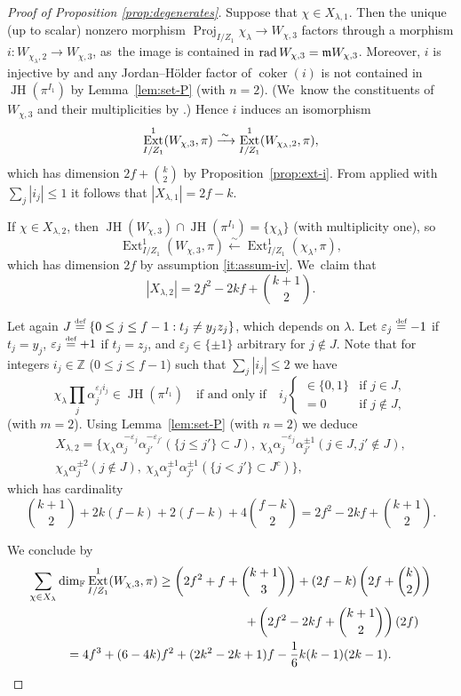 \documentclass[JEP,XML,SOM,Unicode,NoFloatCountersInSection, NoEqCountersInSection,published]{cedram}
\newcommand{\defeq}{\stackrel{\textrm{\tiny{\upshape{def}}}}{=}}
\newcommand{\F}{\mathbb{F}}
\newcommand{\Z}{{\mathbb Z}}
\DeclareMathOperator{\coker}{coker}
\DeclareMathOperator{\Ext}{Ext}
\DeclareMathOperator{\JH}{\mathrm{JH}}
\DeclareMathOperator{\Proj}{Proj}
\DeclareMathOperator{\rad}{rad}
\let\ve\varepsilon
\theoremstyle{plain}
\theoremstyle{definition}
\begin{document}
\begin{proof}[Proof of Proposition \ref{prop:degenerates}]
Suppose that $\chi \in X_{\lambda,1}$.
Then the unique (up to scalar) nonzero morphism $\Proj_{I/Z_1} \chi_\lambda \to W_{\chi,3}$ factors through a morphism $i: W_{\chi_\lambda,2} \to W_{\chi,3}$, as~the image is contained in $\rad W_{\chi,3} = \m W_{\chi,3}$.
Moreover, $i$ is injective by \cite[Lem.\,6.1.2]{BHHMS1} and any Jordan--Hölder factor of $\coker(i)$ is not contained in $\JH(\pi^{I_1})$ by Lemma~\ref{lem:set-P} (with $n = 2$).
(We~know the constituents of $W_{\chi,3}$ and their multiplicities by \cite[(44)]{BHHMS1}.)
Hence $i$ induces an isomorphism
\[
\Ext^1_{I/Z_1}(W_{\chi,3},\pi) \congto \Ext^1_{I/Z_1}(W_{\chi_\lambda,2},\pi),
\]
which has dimension $2f+\binom k2$ by Proposition~\ref{prop:ext-i}.
From
\cite[Lem.\,2.3.6(ii)]{BHHMS4} applied with $\sum_j |i_j| \le 1$ it follows that $|X_{\lambda,1}| = 2f-k$.

If $\chi \in X_{\lambda,2}$, then $\JH(W_{\chi,3}) \cap \JH(\pi^{I_1}) = \{\chi_\lambda\}$ (with multiplicity one), so
\[
\Ext^1_{I/Z_1}(W_{\chi,3},\pi) \xleftarrow{\,\sim\,} \Ext^1_{I/Z_1}(\chi_\lambda,\pi),
\]
which has dimension $2f$ by assumption \eqref{it:assum-iv}. We~claim that
\[
|X_{\lambda,2}| = 2f^2-2kf+\binom{k+1}2.
\]

Let again $J \defeq \{ 0 \le j \le f-1: t_j \ne y_jz_j \}$, which depends on $\lambda$.
Let $\ve_j \defeq -1$ if $t_j = y_j$, $\ve_j \defeq +1$ if $t_j = z_j$, and $\ve_j \in \{\pm 1\}$ arbitrary for $j \notin J$.
Note that for integers $i_j \in \Z$ ($0 \le j \le f-1$) such that $\sum_j |i_j| \le 2$ we have
\[
\chi_\lambda \prod_j \alpha_j^{\ve_j i_j} \in \JH(\pi^{I_1})\quad \text{if and only if}\quad
i_j \begin{cases}
\in \{0,1\}&\text{if }j \in J,\\
 = 0&\text{if }j\notin J,
 \end{cases}
\]
\cf \cite[Lem.\,2.3.6(ii)]{BHHMS4} (with $m = 2$).
Using Lemma~\ref{lem:set-P} (with $n=2$) we deduce
\begin{multline*}
X_{\lambda,2} = \{ \chi_\lambda \alpha_j^{-\ve_j}\alpha_{j'}^{-\ve_{j'}} (\{j \le j'\} \subset J),\
\chi_\lambda \alpha_j^{-\ve_j}\alpha_{j'}^{\pm 1} (j \in J, j' \notin J), \\
\chi_\lambda \alpha_j^{\pm 2} (j \notin J),\
\chi_\lambda \alpha_j^{\pm 1}\alpha_{j'}^{\pm 1} (\{j < j'\} \subset J^c) \},
\end{multline*}
which has cardinality
\begin{equation*}
\binom{k+1}2 + 2k(f-k) + 2(f-k) + 4\binom{f-k}2 = 2f^2-2kf+\binom{k+1}2.
\end{equation*}

We conclude by
\begin{multline*}
\sum_{\chi \in X_{\lambda}} \dim_\F \Ext^1_{I/Z_1}(W_{\chi,3},\pi) \ge \left(2f^2+f+\binom{k+1}3\right) + (2f-k)\left(2f+\binom k2\right) \\
\shoveright{+ \left(2f^2-2kf+\binom{k+1}2\right)(2f)}\\
= 4f^3 + (6-4k)f^2 + (2k^2-2k+1)f - \frac 16 k(k-1)(2k-1).\qedhere
\end{multline*}
\end{proof}

\backmatter


\end{document}
